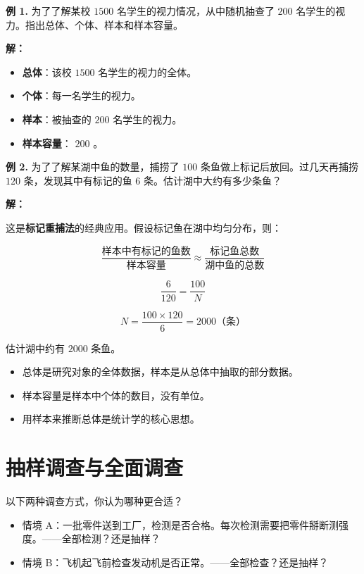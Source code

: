 \begin{workedexamples}


\textbf{例 1.} 为了了解某校 $1500$ 名学生的视力情况，从中随机抽查了 $200$ 名学生的视力。指出总体、个体、样本和样本容量。

\textbf{解：}

\begin{itemize}
  \item \textbf{总体}：该校 $1500$ 名学生的视力的全体。
  \item \textbf{个体}：每一名学生的视力。
  \item \textbf{样本}：被抽查的 $200$ 名学生的视力。
  \item \textbf{样本容量}： $200$ 。
\end{itemize}


\textbf{例 2.} 为了了解某湖中鱼的数量，捕捞了 $100$ 条鱼做上标记后放回。过几天再捕捞 $120$ 条，发现其中有标记的鱼 $6$ 条。估计湖中大约有多少条鱼？

\textbf{解：}

这是\textbf{标记重捕法}的经典应用。假设标记鱼在湖中均匀分布，则：

\[
\frac{\text{样本中有标记的鱼数}}{\text{样本容量}} \approx \frac{\text{标记鱼总数}}{\text{湖中鱼的总数}}
\]


\[
\frac{6}{120} = \frac{100}{N}
\]


\[
N = \frac{100 \times 120}{6} = 2000 \text{（条）}
\]


估计湖中约有 $2000$ 条鱼。

\end{workedexamples}

\begin{keytakeaway}


\begin{itemize}
  \item 总体是研究对象的全体数据，样本是从总体中抽取的部分数据。
  \item 样本容量是样本中个体的数目，没有单位。
  \item 用样本来推断总体是统计学的核心思想。
\end{itemize}


\end{keytakeaway}



\section*{抽样调查与全面调查}


\begin{explore}


以下两种调查方式，你认为哪种更合适？

\begin{itemize}
  \item 情境 A：一批零件送到工厂，检测是否合格。每次检测需要把零件掰断测强度。——全部检测？还是抽样？
  \item 情境 B：飞机起飞前检查发动机是否正常。——全部检查？还是抽样？
\end{itemize}


\end{explore}


